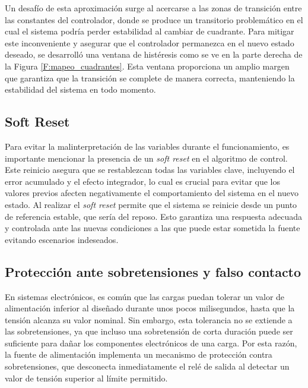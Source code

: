 Un desafío de esta aproximación surge al acercarse a las zonas de transición entre las constantes del controlador, donde se produce un transitorio problemático en el cual el sistema podría perder estabilidad al cambiar de cuadrante. Para mitigar este inconveniente y asegurar que el controlador permanezca en el nuevo estado deseado, se desarrolló una ventana de histéresis como se ve en la parte derecha de la Figura \ref{F:mapeo_cuadrantes}. Esta ventana proporciona un amplio margen que garantiza que la transición se complete de manera correcta, manteniendo la estabilidad del sistema en todo momento.


\subsection{Soft Reset}
Para evitar la malinterpretación de las variables durante el funcionamiento, es importante mencionar la presencia de un \textit{soft reset} en el algoritmo de control. Este reinicio asegura que se restablezcan todas las variables clave, incluyendo el error acumulado y el efecto integrador, lo cual es crucial para evitar que los valores previos afecten negativamente el comportamiento del sistema en el nuevo estado. Al realizar el \textit{soft reset} permite que el sistema se reinicie desde un punto de referencia estable, que sería del reposo. Esto garantiza una respuesta adecuada y controlada ante las nuevas condiciones a las que puede estar sometida la fuente evitando escenarios indeseados.\par 

\subsection{Protección ante sobretensiones y falso contacto}
En sistemas electrónicos, es común que las cargas puedan tolerar un valor de alimentación inferior al diseñado durante unos pocos milisegundos, hasta que la tensión alcanza su valor nominal. Sin embargo, esta tolerancia no se extiende a las sobretensiones, ya que incluso una sobretensión de corta duración puede ser suficiente para dañar los componentes electrónicos de una carga. Por esta razón, la fuente de alimentación implementa un mecanismo de protección contra sobretensiones, que desconecta inmediatamente el relé de salida al detectar un valor de tensión superior al límite permitido.\par

